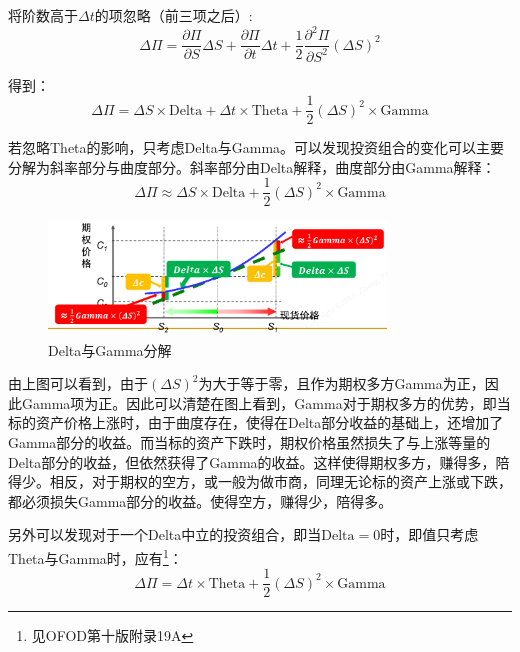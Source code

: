 \documentclass[11pt]{article}
\begin{document}
将阶数高于$\Delta t$的项忽略（前三项之后）:
\begin{equation*}
    \Delta \Pi = \frac{\partial \Pi}{\partial S}\Delta S + \frac{\partial \Pi}{\partial t}\Delta t + \frac{1}{2}\frac{\partial^2 \Pi}{\partial S^2}(\Delta S)^2
\end{equation*}

得到：
\begin{equation*}
    \boxed{
        \Delta \Pi = \Delta S \times \text{Delta} + \Delta t \times \text{Theta} + \frac{1}{2} (\Delta S)^2 \times \text{Gamma}
    }
\end{equation*}

若忽略Theta的影响，只考虑Delta与Gamma。可以发现投资组合的变化可以主要分解为斜率部分与曲度部分。斜率部分由Delta解释，曲度部分由Gamma解释：
\begin{equation*}
    \Delta \Pi \approx \Delta S \times \text{Delta} + \frac{1}{2} (\Delta S)^2 \times \text{Gamma}
\end{equation*}

\begin{figure}[H]
    \centering
    \includegraphics[width=0.8\textwidth]{fig/delta-gamma-decom.png}
    \caption{Delta与Gamma分解}
    \label{fig:delta-gamma-decom}
\end{figure}

由上图可以看到，由于$(\Delta S)^2$为大于等于零，且作为期权多方Gamma为正，因此Gamma项为正。因此可以清楚在图上看到，Gamma对于期权多方的优势，即当标的资产价格上涨时，由于曲度存在，使得在Delta部分收益的基础上，还增加了Gamma部分的收益。而当标的资产下跌时，期权价格虽然损失了与上涨等量的Delta部分的收益，但依然获得了Gamma的收益。这样使得期权多方，赚得多，陪得少。相反，对于期权的空方，或一般为做市商，同理无论标的资产上涨或下跌，都必须损失Gamma部分的收益。使得空方，赚得少，陪得多。

另外可以发现对于一个Delta中立的投资组合，即当$\text{Delta}=0$时，即值只考虑Theta与Gamma时，应有\footnote{见OFOD第十版附录19A\label{ofod_19a}}：
\begin{equation*}
    \Delta \Pi = \Delta t \times \text{Theta} + \frac{1}{2} (\Delta S)^2 \times \text{Gamma}
\end{equation*}
\end{document}
